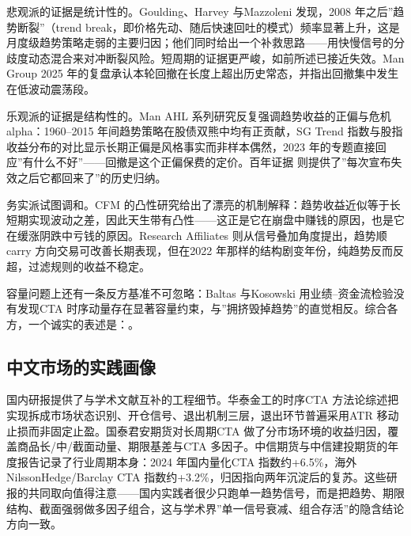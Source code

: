 \documentclass[12pt,a4paper]{ctexart}
\begin{document}
悲观派的证据是统计性的。Goulding、Harvey 与Mazzoleni 发现，2008 年之后”\hspace{0.3em}趋势断裂”（trend break，即价格先动、随后快速回吐的模式）频率显著上升，这是月度级趋势策略走弱的主要归因；他们同时给出一个补救思路——用快慢信号的分歧度动态混合来对冲断裂风险\cite{10}。短周期的证据更严峻，如前所述已接近失效\cite{11}。Man Group 2025 年的复盘承认本轮回撤在长度上超出历史常态，并指出回撤集中发生在低波动震荡段\cite{19}。


乐观派的证据是结构性的。Man AHL 系列研究反复强调趋势收益的正偏与危机alpha：1960–2015 年间趋势策略在股债双熊中均有正贡献\cite{15}，SG Trend 指数与股指收益分布的对比显示长期正偏是风格事实而非样本偶然\cite{18}，2023 年的专题直接回应”\hspace{0.3em}有什么不好”——回撤是这个正偏保费的定价\cite{16}。百年证据\cite{04, 05} 则提供了”\hspace{0.3em}每次宣布失效之后它都回来了”\hspace{0.3em}的历史归纳。


务实派试图调和。CFM 的凸性研究给出了漂亮的机制解释：趋势收益近似等于长短期实现波动之差，因此天生带有凸性——这正是它在崩盘中赚钱的原因，也是它在缓涨阴跌中亏钱的原因\cite{13}。Research Aﬀiliates 则从信号叠加角度提出，趋势顺carry 方向交易可改善长期表现，但在2022 年那样的结构剧变年份，纯趋势反而反超，过滤规则的收益不稳定\cite{22}。


容量问题上还有一条反方基准不可忽略：Baltas 与Kosowski 用业绩–资金流检验没有发现CTA 时序动量存在显著容量约束\cite{07}，与”\hspace{0.3em}拥挤毁掉趋势”\hspace{0.3em}的直觉相反。综合各方，一个诚实的表述是：。


\subsection{中文市场的实践画像}

国内研报提供了与学术文献互补的工程细节。华泰金工的时序CTA 方法论综述把实现拆成市场状态识别、开仓信号、退出机制三层，退出环节普遍采用ATR 移动止损而非固定止盈\cite{23}。国泰君安期货对长周期CTA 做了分市场环境的收益归因，覆盖商品长/中/截面动量、期限基差与CTA 多因子\cite{24}。中信期货与中信建投期货的年度报告记录了行业周期本身：2024 年国内量化CTA 指数约+6.5\%，海外NilssonHedge/Barclay CTA 指数约+3.2\%，归因指向两年沉淀后的复苏\cite{25, 26}。这些研报的共同取向值得注意——国内实践者很少只跑单一趋势信号，而是把趋势、期限结构、截面强弱做多因子组合，这与学术界”\hspace{0.3em}单一信号衰减、组合存活”\hspace{0.3em}的隐含结论方向一致。
\end{document}
